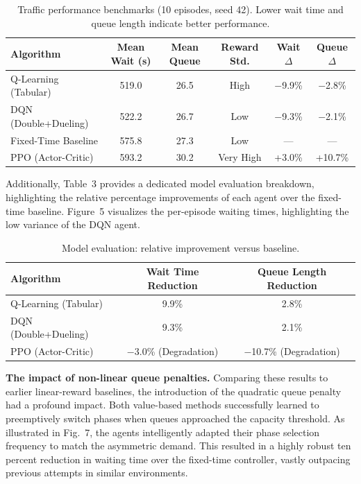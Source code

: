 \documentclass[10pt,a4paper]{article}
\begin{document}
\begin{table}[H]
\centering
\caption{Traffic performance benchmarks (10 episodes, seed 42). Lower wait time and queue length indicate better performance.}
\vspace{0.5em}
\begin{tabular}{l c c c c c}
\toprule
\textbf{Algorithm} & \textbf{Mean Wait (s)} & \textbf{Mean Queue} & \textbf{Reward Std.} & \textbf{Wait $\Delta$} & \textbf{Queue $\Delta$} \\
\midrule
Q-Learning (Tabular)    & 519.0 & 26.5 & High      & $-$9.9\% & $-$2.8\% \\
DQN (Double+Dueling)    & 522.2 & 26.7 & Low       & $-$9.3\% & $-$2.1\% \\
Fixed-Time Baseline     & 575.8 & 27.3 & Low       & ---      & --- \\
PPO (Actor-Critic)      & 593.2 & 30.2 & Very High & +3.0\%   & +10.7\% \\
\bottomrule
\end{tabular}
\label{tab:results}
\end{table}

Additionally, Table~3 provides a dedicated model evaluation breakdown, highlighting the relative percentage improvements of each agent over the fixed-time baseline. Figure~5 visualizes the per-episode waiting times, highlighting the low variance of the DQN agent.

\begin{table}[H]
\centering
\caption{Model evaluation: relative improvement versus baseline.}
\vspace{0.5em}
\begin{tabular}{l c c}
\toprule
\textbf{Algorithm} & \textbf{Wait Time Reduction} & \textbf{Queue Length Reduction} \\
\midrule
Q-Learning (Tabular)     & 9.9\%  & 2.8\% \\
DQN (Double+Dueling)     & 9.3\%  & 2.1\% \\
PPO (Actor-Critic)       & $-$3.0\% (Degradation) & $-$10.7\% (Degradation) \\
\bottomrule
\end{tabular}
\label{tab:improvement}
\end{table}

\textbf{The impact of non-linear queue penalties.}
Comparing these results to earlier linear-reward baselines, the introduction of the quadratic queue penalty had a profound impact. Both value-based methods successfully learned to preemptively switch phases when queues approached the capacity threshold. As illustrated in Fig.~7, the agents intelligently adapted their phase selection frequency to match the asymmetric demand. This resulted in a highly robust ten percent reduction in waiting time over the fixed-time controller, vastly outpacing previous attempts in similar environments.
\end{document}
